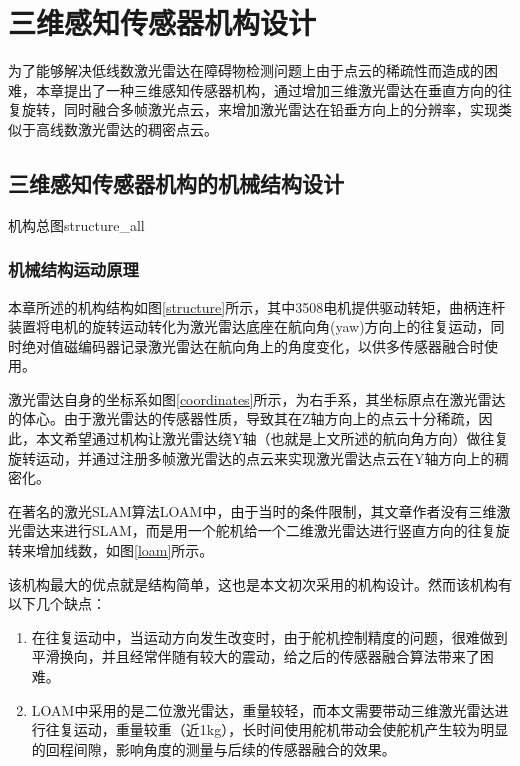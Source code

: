 
\chapter{三维感知传感器机构设计}
为了能够解决低线数激光雷达在障碍物检测问题上由于点云的稀疏性而造成的困难，本章提出了一种三维感知传感器机构，通过增加三维激光雷达在垂直方向的往复旋转，同时融合多帧激光点云，来增加激光雷达在铅垂方向上的分辨率，实现类似于高线数激光雷达的稠密点云。

\section{三维感知传感器机构的机械结构设计}
\begin{pics}[htbp]{机构总图}{structure_all}
\end{pics}
\subsection{机械结构运动原理}
本章所述的机构结构如图\ref{structure}所示，其中3508电机提供驱动转矩，曲柄连杆装置将电机的旋转运动转化为激光雷达底座在航向角(yaw)方向上的往复运动，同时绝对值磁编码器记录激光雷达在航向角上的角度变化，以供多传感器融合时使用。


激光雷达自身的坐标系如图\ref{coordinates}所示，为右手系，其坐标原点在激光雷达的体心。由于激光雷达的传感器性质，导致其在Z轴方向上的点云十分稀疏，因此，本文希望通过机构让激光雷达绕Y轴（也就是上文所述的航向角方向）做往复旋转运动，并通过注册多帧激光雷达的点云来实现激光雷达点云在Y轴方向上的稠密化。

在著名的激光SLAM算法LOAM中，由于当时的条件限制，其文章作者没有三维激光雷达来进行SLAM，而是用一个舵机给一个二维激光雷达进行竖直方向的往复旋转来增加线数，如图\ref{loam}所示。

该机构最大的优点就是结构简单，这也是本文初次采用的机构设计。然而该机构有以下几个缺点：
\begin{enumerate}
    \item 在往复运动中，当运动方向发生改变时，由于舵机控制精度的问题，很难做到平滑换向，并且经常伴随有较大的震动，给之后的传感器融合算法带来了困难。
    \item LOAM中采用的是二位激光雷达，重量较轻，而本文需要带动三维激光雷达进行往复运动，重量较重（近1kg），长时间使用舵机带动会使舵机产生较为明显的回程间隙，影响角度的测量与后续的传感器融合的效果。
\end{enumerate}

